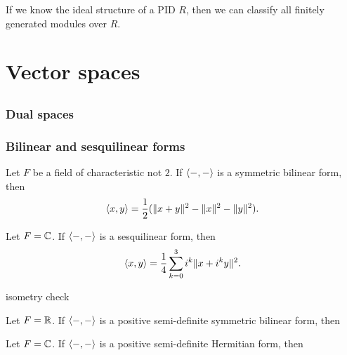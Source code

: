 \documentclass{../../large}
\begin{document}
If we know the ideal structure of a PID $R$, then we can classify all finitely generated modules over $R$.

\begin{prb}
\end{prb}
\begin{prb}
\end{prb}





\part{Vector spaces}


\chapter{}
\section{Dual spaces}

\begin{prb}
\end{prb}

\section{Bilinear and sesquilinear forms}

\begin{prb}
\begin{parts}
\item Let $F$ be a field of characteristic not $2$. If $\langle-,-\rangle$ is a symmetric bilinear form, then
\[\langle x,y\rangle=\frac12(\|x+y\|^2-\|x\|^2-\|y\|^2).\]
\item Let $F=\mathbb{C}$. If $\langle-,-\rangle$ is a sesquilinear form, then
\[\langle x,y\rangle=\frac14\sum_{k=0}^3i^k\|x+i^ky\|^2.\]
\item isometry check
\end{parts}
\end{prb}

\begin{prb}
\begin{parts}
\item Let $F=\mathbb{R}$. If $\langle-,-\rangle$ is a positive semi-definite symmetric bilinear form, then
\item Let $F=\mathbb{C}$. If $\langle-,-\rangle$ is a positive semi-definite Hermitian form, then
\end{parts}
\end{prb}
\end{document}
